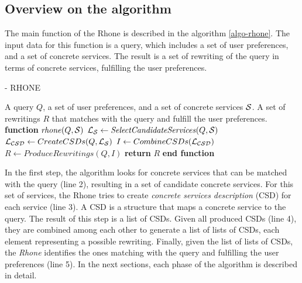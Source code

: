 \subsection{Overview on the algorithm}
The main function of the Rhone is described in the algorithm \ref{algo-rhone}. 
The input data for this function is a query, which includes a set of user preferences, and a set of concrete services. The result is a set of rewriting of the query in terms of concrete services, fulfilling the user preferences.

\begin{algorithm}
\small
\caption{ - RHONE}
\label{algo-rhone}
\begin{algorithmic}[1]
\REQUIRE A query $Q$, a set of user preferences, and a set of concrete services $\hbox{${\cal S}$}$.
\ENSURE A set of rewritings $R$ that matches with the query and fulfill the user preferences.
\STATE \textbf{function} $\mathit{rhone} (Q, \hbox{${\cal S}$})$
 \STATE  $\hbox{${\cal L_{S}}$} \leftarrow \mathit{SelectCandidateServices}(Q, \hbox{${\cal S}$})$ \label{rhone:buildPCD}
 \STATE  $\hbox{${\cal L_{CSD}}$} \leftarrow CreateCSDs(Q, \hbox{${\cal L_{S}}$})$
 \STATE  $I \leftarrow CombineCSDs(\hbox{${\cal L_{CSD}}$})$
 \STATE $R\leftarrow ProduceRewritings(Q, I)$
    \STATE \textbf{return} $R$
\STATE \textbf{end function}
\end{algorithmic}
\end{algorithm}

In the first step, the algorithm looks for concrete services that 
can be matched with the query (line 2), resulting in a set of candidate concrete
services. For this set of services, the Rhone tries to create 
\textit{concrete services description} (CSD) for each service (line 3). 
A CSD is a structure that maps a concrete service to the query. 
The  result of this step is a list of CSDs.
Given all produced CSDs  (line 4), they are combined among each other to generate a list of lists of CSDs, each element representing a possible rewriting.
Finally, given the list of lists of CSDs, the \textit{Rhone} identifies the ones matching with the query and fulfilling the user preferences (line 5).
In the next sections, each phase of the algorithm is described in detail. 

